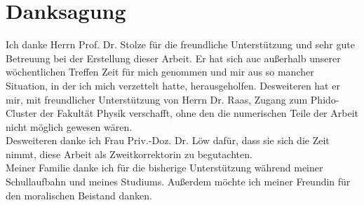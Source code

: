 \chapter*{Danksagung}
Ich danke Herrn Prof. Dr. Stolze für die freundliche Unterstützung und sehr gute Betreuung bei der Erstellung dieser Arbeit. Er hat sich auc außerhalb unserer wöchentlichen Treffen Zeit für mich genommen und mir aus so mancher Situation, in der ich mich verzettelt hatte, herausgeholfen. Desweiteren hat er mir, mit freundlicher Unterstützung von Herrn Dr. Raas, Zugang zum Phido-Cluster der Fakultät Physik verschafft, ohne den die numerischen Teile der Arbeit nicht möglich gewesen wären.\\
Desweiteren danke ich Frau Priv.-Doz. Dr. Löw dafür, dass sie sich die Zeit nimmt, diese Arbeit als Zweitkorrektorin zu begutachten. \\
Meiner Familie danke ich für die bisherige Unterstützung während meiner Schullaufbahn und meines Studiums. Außerdem möchte ich meiner Freundin für den moralischen Beistand danken. \\
\thispagestyle{empty}
